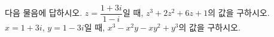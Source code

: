 다음 물음에 답하시오.
 $z=\dfrac{1+3i}{1-i}$일 때, $z^3+2z^2+6z+1$의 값을 구하시오.
 $x=1+3i$, $y=1-3i$일 때, $x^3-x^2y-xy^2+y^3$의 값을 구하시오.
